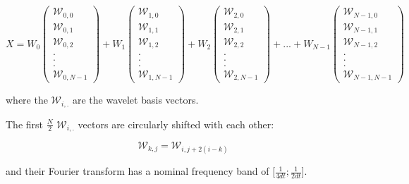 \documentclass[main.tex]{subfiles}
\begin{document}
\begin{equation}
X = W_0 \begin{pmatrix} \mathcal{W}_{0 , 0} \\ \mathcal{W}_{0 , 1} \\ \mathcal{W}_{0 , 2} \\ . \\ . \\ . \\ \mathcal{W}_{0 , N - 1} \end{pmatrix}
+ W_1 \begin{pmatrix} \mathcal{W}_{1 , 0} \\ \mathcal{W}_{1 , 1} \\ \mathcal{W}_{1 , 2} \\ . \\ . \\ . \\ \mathcal{W}_{1 , N - 1} \end{pmatrix}
+ W_2 \begin{pmatrix} \mathcal{W}_{2 , 0} \\ \mathcal{W}_{2 , 1} \\ \mathcal{W}_{2 , 2} \\ . \\ . \\ . \\ \mathcal{W}_{2 , N - 1} \end{pmatrix}
+ ... + W_{N - 1} \begin{pmatrix} \mathcal{W}_{N - 1 , 0} \\ \mathcal{W}_{N - 1 , 1} \\ \mathcal{W}_{N - 1 , 2} \\ . \\ . \\ . \\ \mathcal{W}_{N - 1 , N - 1} \end{pmatrix}
\end{equation}

where the $\mathcal{W}_{i , .}$ are the wavelet basis vectors.

The first $\frac{N}{2}$ $\mathcal{W}_{i , .}$ vectors are circularly shifted with each other:

\begin{equation}
\mathcal{W}_{k , j} = \mathcal{W}_{i , j + 2 \left( i - k \right)}
\end{equation}

and their Fourier transform has a nominal frequency band of $\lbrack \frac{1}{4 dt} ; \frac{1}{2 dt} \rbrack$.
\end{document}
